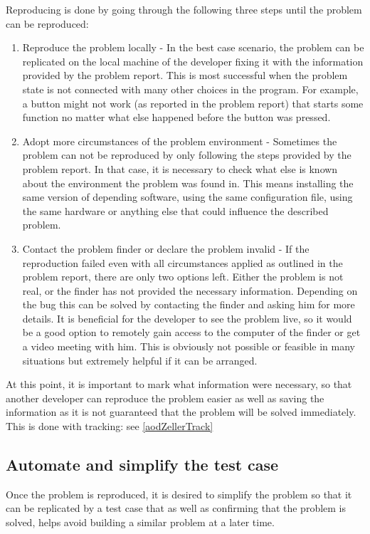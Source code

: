 Reproducing is done by going through the following three steps until the problem can be reproduced:
\begin{enumerate}
  \item Reproduce the problem locally - In the best case scenario, the problem can be replicated on the local machine of the developer fixing it with the information provided by the problem report. This is most successful when the problem state is not connected with many other choices in the program. For example, a button might not work (as reported in the problem report) that starts some function no matter what else happened before the button was pressed.
  \item Adopt more circumstances of the problem environment - Sometimes the problem can not be reproduced by only following the steps provided by the problem report. In that case, it is necessary to check what else is known about the environment the problem was found in. This means installing the same version of depending software, using the same configuration file, using the same hardware or anything else that could influence the described problem.
  \item Contact the problem finder or declare the problem invalid - If the reproduction failed even with all circumstances applied as outlined in the problem report, there are only two options left. Either the problem is not real, or the finder has not provided the necessary information. Depending on the bug this can be solved by contacting the finder and asking him for more details. It is beneficial for the developer to see the problem live, so it would be a good option to remotely gain access to the computer of the finder or get a video meeting with him. This is obviously not possible or feasible in many situations but extremely helpful if it can be arranged.
\end{enumerate}

At this point, it is important to mark what information were necessary, so that another developer can reproduce the problem easier as well as saving the information as it is not guaranteed that the problem will be solved immediately. This is done with tracking: see \ref{aodZellerTrack}

\subsection{Automate and simplify the test case}
Once the problem is reproduced, it is desired to simplify the problem so that it can be replicated by a test case that as well as confirming that the problem is solved, helps avoid building a similar problem at a later time.

